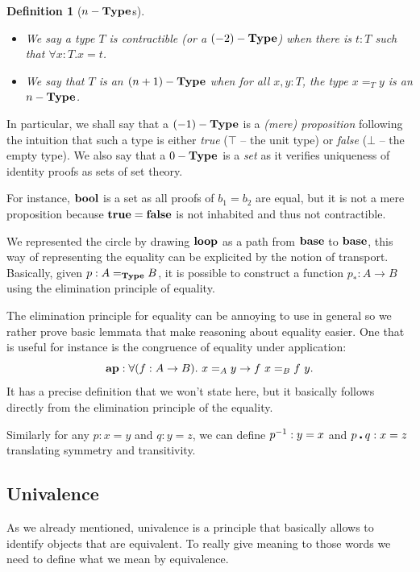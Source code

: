 \documentclass[11pt]{article}
\theoremstyle{plain}
\newtheorem{definition}[theorem]{Definition}
\theoremstyle{remark}
\begin{document}
\begin{definition}[$n-\operatorname{\mathbf{Type}}$s]
  \leavevmode
  \begin{itemize}
    \item We say a type $T$ is \emph{contractible} (or a $(-2)-\operatorname{\mathbf{Type}}$) when
          there is $t : T$ such that $\forall x : T. x = t$.
    \item We say that $T$ is an $(n+1)-\operatorname{\mathbf{Type}}$ when for all $x, y : T$, the type
          $x =_T y$ is an $n-\operatorname{\mathbf{Type}}$.
  \end{itemize}
\end{definition}
%
\noindent
In particular, we shall say that a $(-1)-\operatorname{\mathbf{Type}}$ is a \emph{(mere) proposition}
following the intuition that such a type is either \emph{true} ($\top$ -- the
unit type) or \emph{false} ($\bot$ -- the empty type).
We also say that a $0-\operatorname{\mathbf{Type}}$ is a \emph{set} as it verifies uniqueness of
identity proofs as sets of set theory.

For instance, $\operatorname{\mathbf{bool}}$ is a set as all proofs of $b_1 = b_2$ are equal, but it
is not a mere proposition because $\operatorname{\mathbf{true}} = \operatorname{\mathbf{false}}$ is not inhabited and thus
not contractible.

We represented the circle by drawing $\operatorname{\mathbf{loop}}$ as a path from $\operatorname{\mathbf{base}}$ to
$\operatorname{\mathbf{base}}$, this way of representing the equality can be explicited by the notion
of transport.
Basically, given $p : A =_{\operatorname{\mathbf{Type}}} B$, it is possible to construct a function
$p_* : A \to B$ using the elimination principle of equality.

The elimination principle for equality can be annoying to use in general so we
rather prove basic lemmata that make reasoning about equality easier.
One that is useful for instance is the congruence of equality under application:
\[ \operatorname{\mathbf{ap}} : \forall (f : A \to B).\ x =_A y \to f\ x =_B f\ y. \]
\noindent
It has a precise definition that we won't state here, but it basically
follows directly from the elimination principle of the equality.

Similarly for any $p : x = y$ and $q : y = z$, we can define
$p^{-1} : y = x$ and $p \centerdot q : x = z$ translating symmetry and transitivity.

\subsection{Univalence}

As we already mentioned, univalence is a principle that basically allows to
identify objects that are equivalent. To really give meaning to those words we
need to define what we mean by equivalence.
\end{document}
